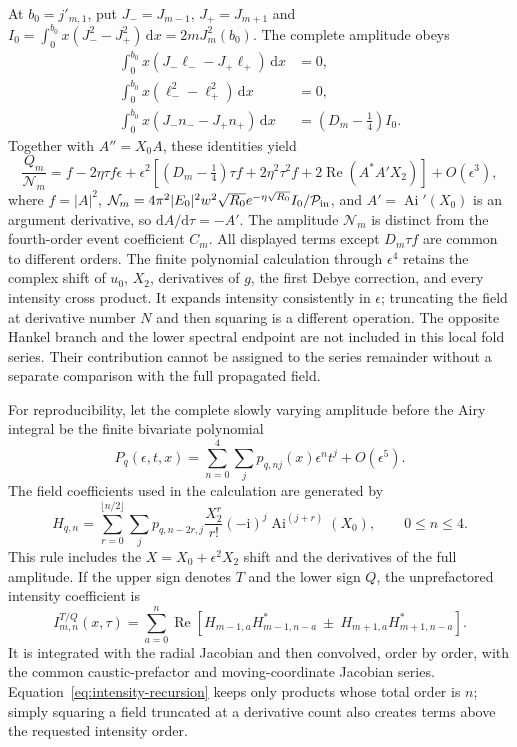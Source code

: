 \documentclass[11pt,a4paper]{article}
\newcommand{\ii}{\mathrm{i}}
\newcommand{\Ai}{\operatorname{Ai}}
\begin{document}
At $b_0=j'_{m,1}$, put $J_-=J_{m-1}$, $J_+=J_{m+1}$ and
$I_0=\int_0^{b_0}x(J_-^2-J_+^2)\,\mathrm{d}x=2mJ_m^2(b_0)$.
The complete amplitude obeys
\begin{align}
\int_0^{b_0}x(J_-\ell_--J_+\ell_+)\,\mathrm{d}x&=0,\\
\int_0^{b_0}x(\ell_-^2-\ell_+^2)\,\mathrm{d}x&=0,\\
\int_0^{b_0}x(J_-n_--J_+n_+)\,\mathrm{d}x&=(D_m-\tfrac14)I_0.
\end{align}
Together with $A''=X_0A$, these identities yield
\begin{equation}
\frac{Q_m}{\mathcal N_m}
=f-2\eta\tau f\epsilon+
\epsilon^2\left[(D_m-\tfrac14)\tau f+2\eta^2\tau^2f
+2\operatorname{Re}(A^*A'X_2)\right]+O(\epsilon^3),
\end{equation}
where $f=|A|^2$,
$\mathcal N_m=4\pi^2|E_0|^2w^2\sqrt{R_0}e^{-\eta\sqrt{R_0}}I_0/\mathcal P_{\rm in}$,
and $A'=\Ai'(X_0)$ is an argument derivative, so $\mathrm{d}A/\mathrm{d}\tau=-A'$.
The amplitude $\mathcal N_m$ is distinct from the fourth-order event
coefficient $C_m$. All displayed terms except $D_m\tau f$ are common to
different orders. The finite polynomial calculation through $\epsilon^4$
retains the complex shift of $u_0$, $X_2$, derivatives of $g$, the first
Debye correction, and every intensity cross product. It expands intensity
consistently in $\epsilon$; truncating the field at derivative number $N$
and then squaring is a different operation. The opposite Hankel branch and
the lower spectral endpoint are not included in this local fold series.
Their contribution cannot be assigned to the series remainder without a
separate comparison with the full propagated field.

For reproducibility, let the complete slowly varying amplitude before the
Airy integral be the finite bivariate polynomial
\begin{equation}
P_q(\epsilon,t,x)=\sum_{n=0}^4\sum_j
p_{q,nj}(x)\epsilon^n t^j+O(\epsilon^5).
\end{equation}
The field coefficients used in the calculation are generated by
\begin{equation}
H_{q,n}=\sum_{r=0}^{\lfloor n/2\rfloor}\sum_j
p_{q,n-2r,j}\frac{X_2^r}{r!}(-\ii)^j
\Ai^{(j+r)}(X_0),\qquad 0\le n\le4.
\label{eq:field-recursion}
\end{equation}
This rule includes the $X=X_0+\epsilon^2X_2$ shift and the derivatives of
the full amplitude. If the upper sign denotes $T$ and the lower sign $Q$,
the unprefactored intensity coefficient is
\begin{equation}
I^{T/Q}_{m,n}(x,\tau)=\sum_{a=0}^n\operatorname{Re}
\left[H_{m-1,a}H_{m-1,n-a}^*\ \mathbin{\pm}\
H_{m+1,a}H_{m+1,n-a}^*\right].
\label{eq:intensity-recursion}
\end{equation}
It is integrated with the radial Jacobian and then convolved, order by
order, with the common caustic-prefactor and moving-coordinate Jacobian
series. Equation~\eqref{eq:intensity-recursion} keeps only products whose
total order is $n$; simply squaring a field truncated at a derivative count
also creates terms above the requested intensity order.
\end{document}
